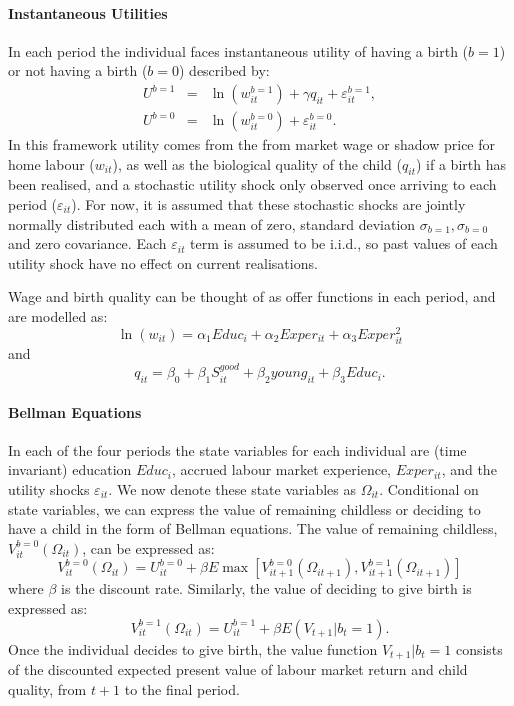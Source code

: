 \documentclass[a4paper, 11 pt]{article}
\theoremstyle{plain}
\begin{document}
\begin{spacing}{1.2}
\paragraph{Instantaneous Utilities}
In each period the individual faces instantaneous utility of having a birth
($b=1$) or not having a birth ($b=0$) described by:
\begin{eqnarray}
U^{b=1}&=&\ln(w_{it}^{b=1}) + \gamma q_{it} + \varepsilon^{b=1}_{it}, \nonumber \\
U^{b=0}&=&\ln(w_{it}^{b=0}) + \varepsilon^{b=0}_{it}. \nonumber 
\end{eqnarray}
In this framework utility comes from the from market wage or shadow price for 
home labour ($w_{it}$), as well as the biological quality of the child ($q_{it}$)
if a birth has been realised, and a stochastic utility shock only observed once 
arriving to each period ($\varepsilon_{it}$).  For now, it is assumed that these
stochastic shocks are jointly normally distributed each with a mean of zero, 
standard deviation $\sigma_{b=1},\sigma_{b=0}$ and zero covariance.  Each 
$\varepsilon_{it}$ term is assumed to be i.i.d., so past values of each utility
shock have no effect on current realisations.

Wage and birth quality can be thought of as offer functions in each period, and 
are modelled as:
\[
\ln(w_{it})=\alpha_1 Educ_{i} + \alpha_2 Exper_{it} + \alpha_3 Exper_{it}^2
\]
and
\[
q_{it} = \beta_0 + \beta_1 S^{good}_{it} + \beta_2 young_{it} + \beta_3 Educ_{i}.
\]

\paragraph{Bellman Equations} In each of the four periods the state variables
for each individual are (time invariant) education $Educ_i$, accrued labour 
market experience, $Exper_{it}$, and the utility shocks $\varepsilon_{it}$.  
We now denote these state variables as $\Omega_{it}$.  Conditional on state 
variables, we can express the value of remaining childless or deciding to have 
a child in the form of Bellman equations.  The value of remaining childless, 
$V_{it}^{b=0}(\Omega_{it})$, can be expressed as:
\begin{equation}
\label{beEqn:VF0}
V_{it}^{b=0}(\Omega_{it})=U_{it}^{b=0}+\beta E\max
                         [V_{it+1}^{b=0}(\Omega_{it+1}),V_{it+1}^{b=1}(\Omega_{it+1})]
\end{equation}
where $\beta$ is the discount rate.  Similarly, the value of deciding to
give birth is expressed as:
\begin{equation}
\label{beEqn:VF1}
V_{it}^{b=1}(\Omega_{it})=U_{it}^{b=1}+\beta E(V_{t+1}|b_t=1).
\end{equation}
Once the individual decides to give birth, the value function $V_{t+1}|b_t=1$
consists of the discounted expected present value of labour market return and 
child quality, from $t+1$ to the final period.


\end{spacing}
\end{document}
